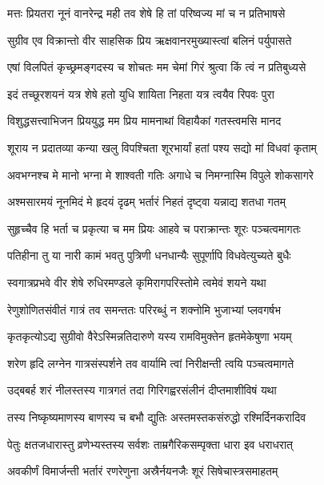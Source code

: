 \twolineshloka
{मत्तः प्रियतरा नूनं वानरेन्द्र मही तव}
{शेषे हि तां परिष्वज्य मां च न प्रतिभाषसे} %

\twolineshloka
{सुग्रीव एव विक्रान्तो वीर साहसिक प्रिय}
{ऋक्षवानरमुख्यास्त्वां बलिनं पर्युपासते} %

\twolineshloka
{एषां विलपितं कृच्छ्रमङ्गदस्य च शोचतः}
{मम चेमां गिरं श्रुत्वा किं त्वं न प्रतिबुध्यसे} %

\twolineshloka
{इदं तच्छूरशयनं यत्र शेषे हतो युधि}
{शायिता निहता यत्र त्वयैव रिपवः पुरा} %

\twolineshloka
{विशुद्धसत्त्वाभिजन प्रिययुद्ध मम प्रिय}
{मामनाथां विहायैकां गतस्त्वमसि मानद} %

\twolineshloka
{शूराय न प्रदातव्या कन्या खलु विपश्चिता}
{शूरभार्यां हतां पश्य सद्यो मां विधवां कृताम्} %

\twolineshloka
{अवभग्नश्च मे मानो भग्ना मे शाश्वती गतिः}
{अगाधे च निमग्नास्मि विपुले शोकसागरे} %

\twolineshloka
{अश्मसारमयं नूनमिदं मे हृदयं दृढम्}
{भर्तारं निहतं दृष्ट्वा यन्नाद्य शतधा गतम्} %

\twolineshloka
{सुहृच्चैव हि भर्ता च प्रकृत्या च मम प्रियः}
{आहवे च पराक्रान्तः शूरः पञ्चत्वमागतः} %

\twolineshloka
{पतिहीना तु या नारी कामं भवतु पुत्रिणी}
{धनधान्यैः सुपूर्णापि विधवेत्युच्यते बुधैः} %

\twolineshloka
{स्वगात्रप्रभवे वीर शेषे रुधिरमण्डले}
{कृमिरागपरिस्तोमे त्वमेवं शयने यथा} %

\twolineshloka
{रेणुशोणितसंवीतं गात्रं तव समन्ततः}
{परिरब्धुं न शक्नोमि भुजाभ्यां प्लवगर्षभ} %

\twolineshloka
{कृतकृत्योऽद्य सुग्रीवो वैरेऽस्मिन्नतिदारुणे}
{यस्य रामविमुक्तेन हृतमेकेषुणा भयम्} %

\twolineshloka
{शरेण हृदि लग्नेन गात्रसंस्पर्शने तव}
{वार्यामि त्वां निरीक्षन्ती त्वयि पञ्चत्वमागते} %

\twolineshloka
{उद्बबर्ह शरं नीलस्तस्य गात्रगतं तदा}
{गिरिगह्वरसंलीनं दीप्तमाशीविषं यथा} %

\twolineshloka
{तस्य निष्कृष्यमाणस्य बाणस्य च बभौ द्युतिः}
{अस्तमस्तकसंरुद्धो रश्मिर्दिनकरादिव} %

\twolineshloka
{पेतुः क्षतजधारास्तु व्रणेभ्यस्तस्य सर्वशः}
{ताम्रगैरिकसम्पृक्ता धारा इव धराधरात्} %

\twolineshloka
{अवकीर्णं विमार्जन्ती भर्तारं रणरेणुना}
{अस्रैर्नयनजैः शूरं सिषेचास्त्रसमाहतम्} %

